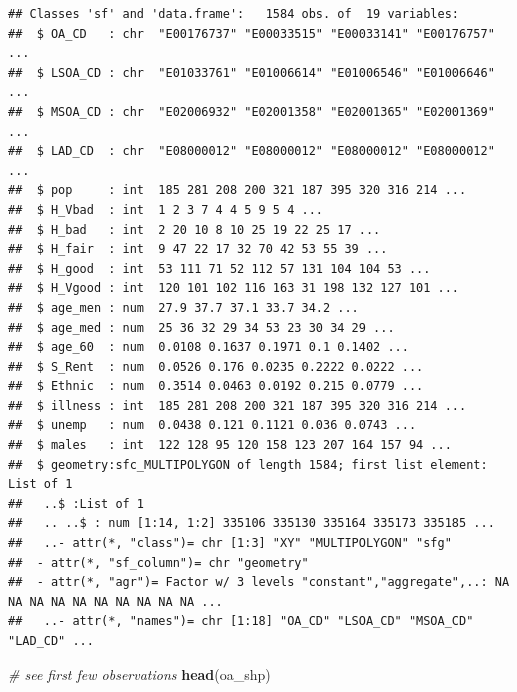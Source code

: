 \documentclass[
]{book}
\newenvironment{Shaded}{\begin{snugshade}}{\end{snugshade}}
\newcommand{\CommentTok}[1]{\textcolor[rgb]{0.56,0.35,0.01}{\textit{#1}}}
\newcommand{\KeywordTok}[1]{\textcolor[rgb]{0.13,0.29,0.53}{\textbf{#1}}}
\newcommand{\NormalTok}[1]{#1}
\begin{document}
\begin{verbatim}
## Classes 'sf' and 'data.frame':   1584 obs. of  19 variables:
##  $ OA_CD   : chr  "E00176737" "E00033515" "E00033141" "E00176757" ...
##  $ LSOA_CD : chr  "E01033761" "E01006614" "E01006546" "E01006646" ...
##  $ MSOA_CD : chr  "E02006932" "E02001358" "E02001365" "E02001369" ...
##  $ LAD_CD  : chr  "E08000012" "E08000012" "E08000012" "E08000012" ...
##  $ pop     : int  185 281 208 200 321 187 395 320 316 214 ...
##  $ H_Vbad  : int  1 2 3 7 4 4 5 9 5 4 ...
##  $ H_bad   : int  2 20 10 8 10 25 19 22 25 17 ...
##  $ H_fair  : int  9 47 22 17 32 70 42 53 55 39 ...
##  $ H_good  : int  53 111 71 52 112 57 131 104 104 53 ...
##  $ H_Vgood : int  120 101 102 116 163 31 198 132 127 101 ...
##  $ age_men : num  27.9 37.7 37.1 33.7 34.2 ...
##  $ age_med : num  25 36 32 29 34 53 23 30 34 29 ...
##  $ age_60  : num  0.0108 0.1637 0.1971 0.1 0.1402 ...
##  $ S_Rent  : num  0.0526 0.176 0.0235 0.2222 0.0222 ...
##  $ Ethnic  : num  0.3514 0.0463 0.0192 0.215 0.0779 ...
##  $ illness : int  185 281 208 200 321 187 395 320 316 214 ...
##  $ unemp   : num  0.0438 0.121 0.1121 0.036 0.0743 ...
##  $ males   : int  122 128 95 120 158 123 207 164 157 94 ...
##  $ geometry:sfc_MULTIPOLYGON of length 1584; first list element: List of 1
##   ..$ :List of 1
##   .. ..$ : num [1:14, 1:2] 335106 335130 335164 335173 335185 ...
##   ..- attr(*, "class")= chr [1:3] "XY" "MULTIPOLYGON" "sfg"
##  - attr(*, "sf_column")= chr "geometry"
##  - attr(*, "agr")= Factor w/ 3 levels "constant","aggregate",..: NA NA NA NA NA NA NA NA NA NA ...
##   ..- attr(*, "names")= chr [1:18] "OA_CD" "LSOA_CD" "MSOA_CD" "LAD_CD" ...
\end{verbatim}

\begin{Shaded}
\begin{Highlighting}[]
\CommentTok{# see first few observations}
\KeywordTok{head}\NormalTok{(oa_shp)}
\end{Highlighting}
\end{Shaded}
\end{document}
